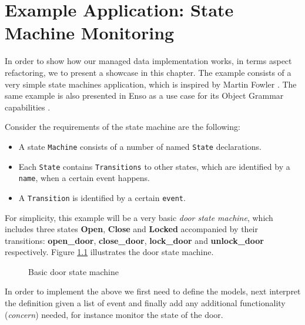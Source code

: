 
\chapter{Example Application: State Machine Monitoring}\label{Example Application}
In order to show how our managed data implementation works, in terms aspect refactoring, we to present a showcase in this chapter.
The example consists of a very simple state machines application, which is inspired by Martin Fowler \cite{fowler2010domain}.
The same example is also presented in Enso as a use case for its Object Grammar capabilities \cite{storm2012object}.

Consider the requirements of the state machine are the following: 
\begin{itemize}
	\item A state \texttt{Machine} consists of a number of named \texttt{State} declarations.

	\item Each \texttt{State} contains \texttt{Transitions} to other states, which are identified by a \texttt{name}, when a certain event happens.

	\item A \texttt{Transition} is identified by a certain \texttt{event}.
\end{itemize}

For simplicity, this example will be a very basic \textit{door state machine}, which includes three states \textbf{Open}, \textbf{Close} and \textbf{Locked} accompanied by their transitions: \textbf{open\_door}, \textbf{close\_door}, \textbf{lock\_door} and \textbf{unlock\_door} respectively.
Figure \ref{fig:State_machine} illustrates the door state machine.

\begin{figure}[H]
	\centering
  	\caption{Basic door state machine}
  	\label{fig:State_machine}
\end{figure}

In order to implement the above we first need to define the models, next interpret the definition given a list of event and finally add any additional functionality (\textit{concern}) needed, for instance monitor the state of the door.

